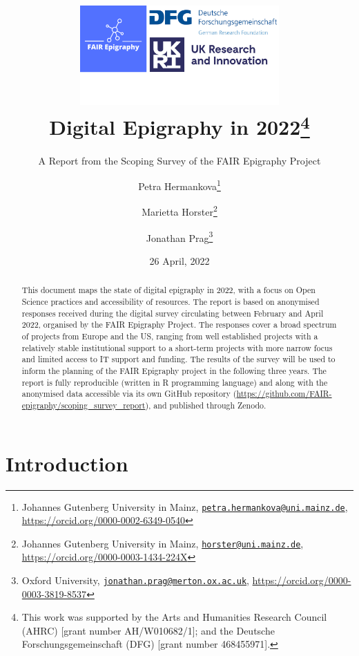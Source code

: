\documentclass[
  12pt,
]{scrreprt}
\title{\includegraphics[width=3in,height=\textheight]{../assets/banner.png}\\
Digital Epigraphy in 2022\thanks{This work was supported by the Arts and
Humanities Research Council (AHRC) {[}grant number AH/W010682/1{]}; and
the Deutsche Forschungsgemeinschaft (DFG) {[}grant number
468455971{]}.}}
\subtitle{A Report from the Scoping Survey of the FAIR Epigraphy
Project}
\author{Petra Hermankova\footnote{Johannes Gutenberg University in
  Mainz,
  \href{mailto:petra.hermankova@uni.mainz.de}{\nolinkurl{petra.hermankova@uni.mainz.de}},
  \url{https://orcid.org/0000-0002-6349-0540}} \and Marietta
Horster\footnote{Johannes Gutenberg University in Mainz,
  \href{mailto:horster@uni.mainz.de}{\nolinkurl{horster@uni.mainz.de}},
  \url{https://orcid.org/0000-0003-1434-224X}} \and Jonathan
Prag\footnote{Oxford University,
  \href{mailto:jonathan.prag@merton.ox.ac.uk}{\nolinkurl{jonathan.prag@merton.ox.ac.uk}},
  \url{https://orcid.org/0000-0003-3819-8537}}}
\date{26 April, 2022}
\begin{document}
\maketitle
\begin{abstract}
This document maps the state of digital epigraphy in 2022, with a focus
on Open Science practices and accessibility of resources. The report is
based on anonymised responses received during the digital survey
circulating between February and April 2022, organised by the FAIR
Epigraphy Project. The responses cover a broad spectrum of projects from
Europe and the US, ranging from well established projects with a
relatively stable institutional support to a short-term projects with
more narrow focus and limited access to IT support and funding. The
results of the survey will be used to inform the planning of the FAIR
Epigraphy project in the following three years. The report is fully
reproducible (written in R programming language) and along with the
anonymised data accessible via its own GitHub repository
(\url{https://github.com/FAIR-epigraphy/scoping_survey_report}), and
published through Zenodo.
\end{abstract}

{
\hypersetup{linkcolor=}
\setcounter{tocdepth}{2}
\tableofcontents
}
\hypertarget{introduction}{%
\chapter{Introduction}\label{introduction}}
\end{document}
